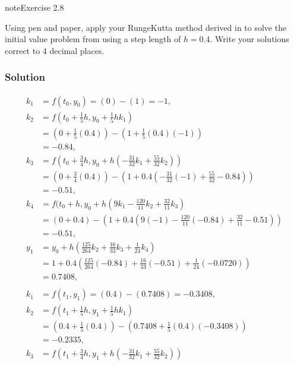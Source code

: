 \documentclass[letterpaper,10pt,english]{jupyterBook}
\begin{document}
\begin{sphinxadmonition}{note}{Exercise 2.8}

\sphinxAtStartPar
Using pen and paper, apply your Runge\sphinxhyphen{}Kutta method derived in {\hyperref[\detokenize{2_ERKs/2.5_ERK_Exercises:ex2-5}]{}} to solve the initial value problem from {\hyperref[\detokenize{2_ERKs/2.5_ERK_Exercises:ex2-6}]{}} using a step length of \(h=0.4\). Write your solutions correct to 4 decimal places.
\subsubsection*{Solution}
\begin{align*}
    k_1 &= f(t_0, y_0) = (0) - (1) = -1, \\
    k_2 &= f(t_0 + \tfrac{1}{5}h, y_0 + \tfrac{1}{5}hk_1) \\
    &= (0 + \tfrac{1}{5}(0.4)) - (1 + \tfrac{1}{5}(0.4)(-1)) \\
    &= -0.84, \\
    k_3 &= f(t_0 + \tfrac{3}{4}h, y_0 + h(-\tfrac{31}{32}k_1 + \tfrac{55}{32}k_2)) \\
    &= (0 + \tfrac{3}{4}(0.4)) - (1 + 0.4(-\tfrac{31}{32}(-1) + \tfrac{55}{32}-0.84)) \\
    &= -0.51, \\
    k_4 &= f(t_0 + h, y_0 + h(9k_1 - \tfrac{120}{11}k_2 + \tfrac{32}{11}k_3) \\
    &= (0 + 0.4) - (1 + 0.4(9(-1) - \tfrac{120}{11}(-0.84) + \tfrac{32}{11}-0.51)) \\
    &= -0.51, \\
    y_1 &= y_0 + h\left( \tfrac{125}{264} k_2 + \tfrac{16}{33} k_3 + \tfrac{1}{24} k_4 \right) \\
    &= 1 + 0.4 \left( \tfrac{125}{264} (-0.84) + \tfrac{16}{33} (-0.51) + \tfrac{1}{24} (-0.0720) \right) \\
    &= 0.7408, \\
    \\
    k_1 &= f(t_1, y_1) = (0.4) - (0.7408) = -0.3408, \\
    k_2 &= f(t_1 + \tfrac{1}{5}h, y_1 + \tfrac{1}{5}hk_1) \\
    &= (0.4 + \tfrac{1}{5}(0.4)) - (0.7408 + \tfrac{1}{5}(0.4)(-0.3408)) \\
    &= -0.2335, \\
    k_3 &= f(t_1 + \tfrac{3}{4}h, y_1 + h(-\tfrac{31}{32}k_1 + \tfrac{55}{32}k_2)) \\

\end{align*}
\end{sphinxadmonition}
\end{document}
